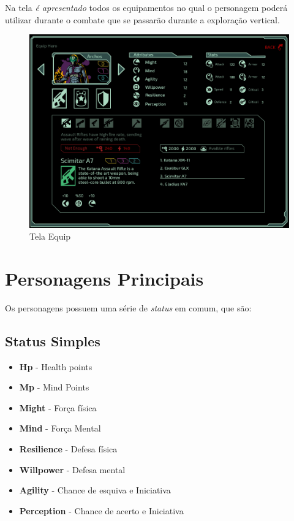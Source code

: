 \documentclass[11pt]{article} %
\begin{document}
Na tela \textit{é apresentado} todos os equipamentos no qual o personagem poderá utilizar durante o combate que se passarão durante a exploração vertical.

\begin{figure}[!htp]
\centering
\includegraphics[scale=0.25]{res/equip.png}
\caption{Tela Equip}
\label{Tela Equip}
\end{figure}

\newpage

\section{Personagens Principais}

Os personagens possuem uma série de \textit{status} em comum, que são:

\subsection{Status Simples}

\begin {itemize}
  \item \textbf{Hp} - Health points 
  \item \textbf{Mp} - Mind Points 
  \item \textbf{Might} - Força física 
  \item \textbf{Mind} - Força Mental 
  \item \textbf{Resilience} - Defesa física 
  \item \textbf{Willpower} - Defesa mental 
  \item \textbf{Agility} - Chance de esquiva e Iniciativa 
  \item \textbf{Perception} - Chance de acerto e Iniciativa
\end {itemize}
\end{document}
